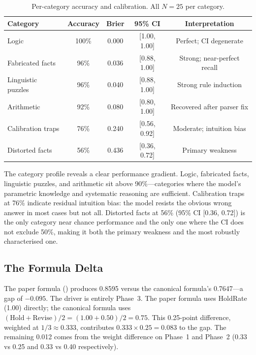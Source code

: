 \documentclass[12pt,a4paper]{article}
\begin{document}
\begin{table}[H]
\centering
\caption{Per-category accuracy and calibration. All $N=25$ per category.}
\label{tab:percategory}
\renewcommand{\arraystretch}{1.25}
\begin{tabular}{@{}lcccc@{}}
\toprule
\textbf{Category} & \textbf{Accuracy} & \textbf{Brier} & \textbf{95\% CI} & \textbf{Interpretation} \\
\midrule
Logic             & 100\% & 0.000 & [1.00, 1.00] & Perfect; CI degenerate \\
Fabricated facts  & 96\%  & 0.036 & [0.88, 1.00] & Strong; near-perfect recall \\
Linguistic puzzles& 96\%  & 0.040 & [0.88, 1.00] & Strong rule induction \\
Arithmetic        & 92\%  & 0.080 & [0.80, 1.00] & Recovered after parser fix \\
Calibration traps & 76\%  & 0.240 & [0.56, 0.92] & Moderate; intuition bias \\
Distorted facts   & 56\%  & 0.436 & [0.36, 0.72] & Primary weakness \\
\bottomrule
\end{tabular}
\end{table}

The category profile reveals a clear performance gradient. Logic, fabricated facts,
linguistic puzzles, and arithmetic sit above 90\%---categories where the model's parametric
knowledge and systematic reasoning are sufficient. Calibration traps at 76\% indicate
residual intuition bias: the model resists the obvious wrong answer in most cases but
not all. Distorted facts at 56\% (95\% CI [0.36, 0.72]) is the only category near
chance performance and the only one where the CI does not exclude 50\%, making it both
the primary weakness and the most robustly characterised one.

\subsection{The Formula Delta}
\label{sec:formuladelta}

The paper formula () produces 0.8595 versus the canonical
formula's 0.7647---a gap of $-0.095$. The driver is entirely Phase~3. The paper formula
uses HoldRate (1.00) directly; the canonical formula uses $(\text{Hold} + \text{Revise})/2 =
(1.00 + 0.50)/2 = 0.75$. This 0.25-point difference, weighted at $1/3 \approx 0.333$,
contributes $0.333 \times 0.25 = 0.083$ to the gap. The remaining 0.012 comes from the
weight difference on Phase~1 and Phase~2 (0.33 vs 0.25 and 0.33 vs 0.40 respectively).
\end{document}
